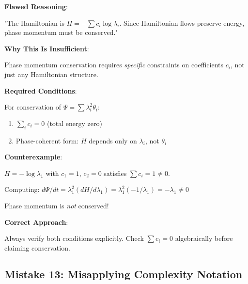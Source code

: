 \begin{warning}
\textbf{Flawed Reasoning}:

"The Hamiltonian is $H = -\sum c_i \log \lambda_i$. Since Hamiltonian flows preserve energy, phase momentum must be conserved."

\textbf{Why This Is Insufficient}:

Phase momentum conservation requires \textit{specific} constraints on coefficients $c_i$, not just any Hamiltonian structure.

\textbf{Required Conditions}:

For conservation of $\Psi = \sum \lambda_i^2 \theta_i$:
\begin{enumerate}
\item $\sum_i c_i = 0$ (total energy zero)
\item Phase-coherent form: $H$ depends only on $\lambda_i$, not $\theta_i$
\end{enumerate}

\textbf{Counterexample}:

$H = -\log \lambda_1$ with $c_1 = 1$, $c_2 = 0$ satisfies $\sum c_i = 1 \neq 0$.

Computing: $d\Psi/dt = \lambda_1^2(dH/d\lambda_1) = \lambda_1^2(-1/\lambda_1) = -\lambda_1 \neq 0$

Phase momentum is \textit{not} conserved!

\textbf{Correct Approach}:

Always verify both conditions explicitly. Check $\sum c_i = 0$ algebraically before claiming conservation.
\end{warning}

\subsection{Mistake 13: Misapplying Complexity Notation}

